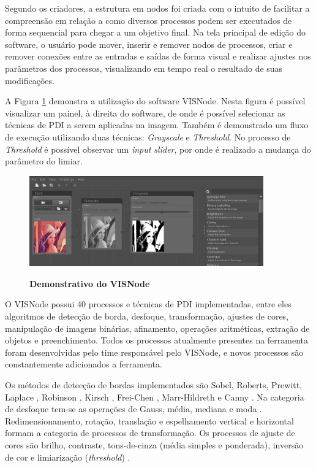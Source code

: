 \documentclass[
	12pt,				%
	oneside,			%
	a4paper,			%
	english,			%
	french,				%
	spanish,			%
	brazil,				%
	]{abntex2}
\newcommand{\vnNumeroTotalProcessos}{40}
\begin{document}
Segundo os criadores, a estrutura em nodos foi criada com o intuito de facilitar a compreensão em relação a como diversos processos podem ser executados de forma sequencial para chegar a um objetivo final. Na tela principal de edição do software, o usuário pode mover, inserir e remover nodos de processos, criar e remover conexões entre as entradas e saídas de forma visual e realizar ajustes nos parâmetros dos processos, visualizando em tempo real o resultado de suas modificações.

A Figura \ref{fig:visnode} demonstra a utilização do software VISNode. Nesta figura é possível visualizar um painel, à direita do software, de onde é possível selecionar as técnicas de PDI a serem aplicadas na imagem. Também é demonstrado um fluxo de execução utilizando duas técnicas: \textit{Grayscale} e \textit{Threshold}. No processo de \textit{Threshold} é possível observar um \textit{input slider}, por onde é realizado a mudança do parâmetro do limiar.

\begin{figure}[ht]
\centering
\caption{\textbf{Demonstrativo do VISNode}}
\includegraphics[width=0.9\textwidth]{imagens/visnode.png}
\sourceAuthor
\label{fig:visnode}
\end{figure}

O VISNode possui \vnNumeroTotalProcessos{} processos e técnicas de PDI implementadas, entre eles algoritmos de detecção de borda, desfoque, transformação, ajustes de cores, manipulação de imagens binárias, afinamento, operações aritméticas, extração de objetos e preenchimento. Todos os processos atualmente presentes na ferramenta foram desenvolvidas pelo time responsável pelo VISNode, e novos processos são constantemente adicionados a ferramenta.

Os métodos de detecção de bordas implementados são Sobel, Roberts, Prewitt, Laplace \cite{gonzalesWoods:2008}, Robinson \cite{robinson1977edge}, Kirsch \cite{kirsch1971computer}, Frei-Chen \cite{chen1977fast}, Marr-Hildreth \cite{marr1980theory} e Canny \cite{canny:1986}. Na categoria de desfoque tem-se as operações de Gauss, média, mediana e moda \cite{gonzalesWoods:2008}. Redimensionamento, rotação, translação e espelhamento vertical e horizontal \cite{gonzalesWoods:2008} formam a categoria de processos de transformação. Os processos de ajuste de cores são brilho, contraste, tons-de-cinza (média simples e ponderada), inversão de cor e limiarização (\textit{threshold})  \cite{gonzalesWoods:2008}. 
\end{document}
